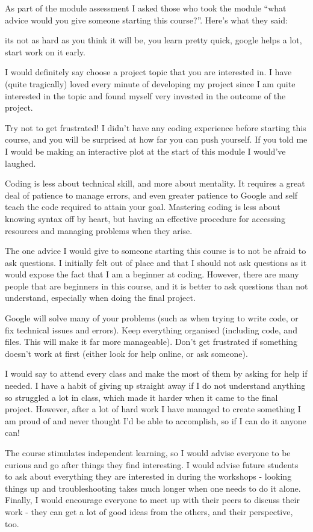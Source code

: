 \documentclass[
  12pt,
  a5paper,
]{book}
\begin{document}
As part of the module assessment I asked those who took the module ``what advice would you give someone starting this course?''. Here's what they said:

its not as hard as you think it will be, you learn pretty quick, google helps a lot, start work on it early.

I would definitely say choose a project topic that you are interested in. I have (quite tragically) loved every minute of developing my project since I am quite interested in the topic and found myself very invested in the outcome of the project.

Try not to get frustrated! I didn't have any coding experience before starting this course, and you will be surprised at how far you can push yourself. If you told me I would be making an interactive plot at the start of this module I would've laughed.

Coding is less about technical skill, and more about mentality. It requires a great deal of patience to manage errors, and even greater patience to Google and self teach the code required to attain your goal. Mastering coding is less about knowing syntax off by heart, but having an effective procedure for accessing resources and managing problems when they arise.

The one advice I would give to someone starting this course is to not be afraid to ask questions. I initially felt out of place and that I should not ask questions as it would expose the fact that I am a beginner at coding. However, there are many people that are beginners in this course, and it is better to ask questions than not understand, especially when doing the final project.

Google will solve many of your problems (such as when trying to write code, or fix technical issues and errors). Keep everything organised (including code, and files. This will make it far more manageable). Don't get frustrated if something doesn't work at first (either look for help online, or ask someone).

I would say to attend every class and make the most of them by asking for help if needed. I have a habit of giving up straight away if I do not understand anything so struggled a lot in class, which made it harder when it came to the final project. However, after a lot of hard work I have managed to create something I am proud of and never thought I'd be able to accomplish, so if I can do it anyone can!

The course stimulates independent learning, so I would advise everyone to be curious and go after things they find interesting. I would advise future students to ask about everything they are interested in during the workshops - looking things up and troubleshooting takes much longer when one needs to do it alone. Finally, I would encourage everyone to meet up with their peers to discuss their work - they can get a lot of good ideas from the others, and their perspective, too.
\end{document}
